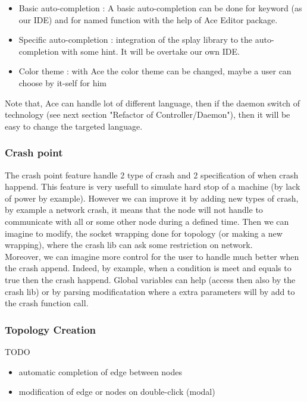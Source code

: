 \documentclass{eplmastersthesis}
\begin{document}
        \begin{itemize}
          \item Basic auto-completion : A basic auto-completion can be done for keyword (as our IDE) and 
          for named function with the help of Ace Editor package. 
          \item Specific auto-completion : integration of the splay library to the auto-completion with some 
          hint. It will be overtake our own IDE.
          \item Color theme : with Ace the color theme can be changed, maybe a user can choose by it-self for him
        \end{itemize}

        Note that, Ace can handle lot of different language, 
        then if the daemon switch of technology (see next section "Refactor of Controller/Daemon"), 
        then it will be easy to change the targeted language.

        \subsubsection{Crash point}

          The crash point feature handle 2 type of crash and 2 specification of when crash happend.
          This feature is very usefull to simulate hard stop of a machine (by lack of power by example).
          However we can improve it by adding new types of crash, by example a network crash, it means
          that the node will not handle to communicate with all or some other node during a defined time.
          Then we can imagine to modify, the socket wrapping done for topology (or making a new wrapping),
          where the crash lib can ask some restriction on network. \\

          Moreover, we can imagine more control for the user to handle much better when the crash append.
          Indeed, by example, when a condition is meet and equals to true then the crash happend. 
          Global variables can help (access then also by the crash lib) or by parsing modificatation
          where a extra parameters will by add to the crash function call.\\          
        
        \subsubsection{Topology Creation}
        {\color{red} TODO}
        \begin{itemize}
          \item automatic completion of edge between nodes
          \item modification of edge or nodes on double-click (modal)
        \end{itemize}
\end{document}
